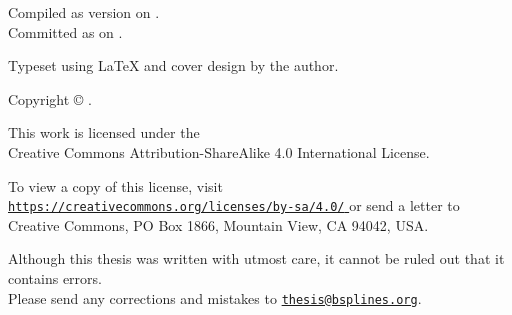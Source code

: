 {  Compiled as version \compileCounterText{} on \currentTimeLong{}.\\
  Committed as \gitCommitText{} on \gitCommitTimeLong{}.
  
  \vspace{1em}
  
  Typeset using \LaTeX{} and cover design by the author.
  
  Copyright \copyright{} \theyear{} \theauthor{}.
  
  \vspace{1em}
  
  \hangindent=29mm%
  This work is licensed under the\\
  Creative Commons Attribution-ShareAlike 4.0 International License.
  
  To view a copy of this license, visit
  \href{%
    https://creativecommons.org/licenses/by-sa/4.0/%
  }{%
    \texttt{https://creativecommons.org/licenses/by-sa/4.0/}%
  }
  or send a letter to
  Creative Commons, PO Box 1866, Mountain View, CA 94042, USA.
  
  \vspace{1em}
  
  Although this thesis was written with utmost care,
  it cannot be ruled out that it contains errors.\\
  Please send any corrections and mistakes to
  \href{mailto:thesis@bsplines.org}{\texttt{thesis@bsplines.org}}.
}

\cleardoublepage
